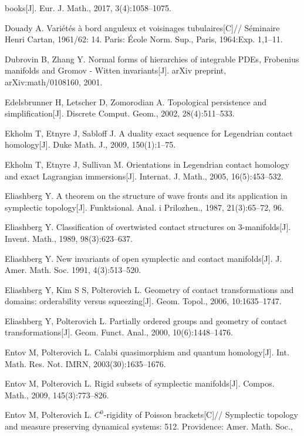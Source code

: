 \begin{enumerate}[label={[\arabic*]},leftmargin=3.2em,itemsep=2pt,parsep=0pt]
        books[J]. Eur. J. Math., 2017, 3(4):1058--1075.
  \item Douady A. Variétés à bord anguleux et voisinages tubulaires[C]// Séminaire Henri
        Cartan, 1961/62: 14. Paris: École Norm. Sup., Paris, 1964:Exp. 1,1--11.
  \item Dubrovin B, Zhang Y. Normal forms of hierarchies of integrable PDEs, Frobenius
        manifolds and Gromov - Witten invariants[J]. arXiv preprint, arXiv:math/0108160,
        2001.
  \item Edelsbrunner H, Letscher D, Zomorodian A. Topological persistence and
        simplification[J]. Discrete Comput. Geom., 2002, 28(4):511--533.
  \item Ekholm T, Etnyre J, Sabloff J. A duality exact sequence for Legendrian contact
        homology[J]. Duke Math. J., 2009, 150(1):1--75.
  \item Ekholm T, Etnyre J, Sullivan M. Orientations in Legendrian contact homology and
        exact Lagrangian immersions[J]. Internat. J. Math., 2005, 16(5):453--532.
  \item Eliashberg Y. A theorem on the structure of wave fronts and its application in
        symplectic topology[J]. Funktsional. Anal. i Prilozhen., 1987, 21(3):65--72, 96.
  \item Eliashberg Y. Classification of overtwisted contact structures on 3-manifolds[J].
        Invent. Math., 1989, 98(3):623--637.
  \item Eliashberg Y. New invariants of open symplectic and contact manifolds[J].
        J. Amer. Math. Soc. 1991, 4(3):513--520.
  \item Eliashberg Y, Kim S S, Polterovich L. Geometry of contact transformations and
        domains: orderability versus squeezing[J]. Geom. Topol., 2006, 10:1635--1747.
  \item Eliashberg Y, Polterovich L. Partially ordered groups and geometry of contact
        transformations[J]. Geom. Funct. Anal., 2000, 10(6):1448--1476.
  \item Entov M, Polterovich L. Calabi quasimorphism and quantum homology[J].
        Int. Math. Res. Not. IMRN, 2003(30):1635--1676.
  \item Entov M, Polterovich L. Rigid subsets of symplectic manifolds[J]. Compos. Math.,
        2009, 145(3):773--826.
  \item Entov M, Polterovich L. $C^0$-rigidity of Poisson brackets[C]// Symplectic topology
        and measure preserving dynamical systems: 512. Providence: Amer. Math. Soc.,

\end{enumerate}
